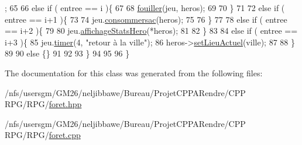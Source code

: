 \begin{DoxyCode}
      ;
65 
66         \textcolor{keywordflow}{else} \textcolor{keywordflow}{if} ( entree == i )\{
67 
68             \hyperlink{class_lieu_a90d7fd86c93e59830e20156ddb7aeb50}{fouiller}(jeu, heros);
69 
70         \}
71 
72         \textcolor{keywordflow}{else} \textcolor{keywordflow}{if} ( entree == i+1 )\{
73 
74             jeu.\hyperlink{class_jeu_a26c7a428a96b1f987150cb708fa7d903}{consommersac}(heros);
75 
76         \}
77 
78         \textcolor{keywordflow}{else} \textcolor{keywordflow}{if} ( entree == i+2 )\{
79 
80             jeu.\hyperlink{class_jeu_a7f9e3b8e6f3ad5d2c47ae29c54f2bdc4}{affichageStatsHero}(*heros);
81 
82         \}
83 
84         \textcolor{keywordflow}{else} \textcolor{keywordflow}{if} ( entree == i+3 )\{
85             jeu.\hyperlink{class_jeu_a52ce4fb6c415b45209db13a589c9d675}{timer}(4, \textcolor{stringliteral}{"retour à la ville"});
86             heros->\hyperlink{class_heros_a8decc0b04f6724de10d2e2a8d1c3395c}{setLieuActuel}(ville);
87 
88         \}
89 
90         \textcolor{keywordflow}{else} \{\}
91 
92 
93     \}
94     
95     
96     \}
\end{DoxyCode}


The documentation for this class was generated from the following files\-:\begin{DoxyCompactItemize}
\item 
/nfs/usersgm/\-G\-M26/neljibbawe/\-Bureau/\-Projet\-C\-P\-P\-A\-Rendre/\-C\-P\-P R\-P\-G/\-R\-P\-G/\hyperlink{foret_8hpp}{foret.\-hpp}\item 
/nfs/usersgm/\-G\-M26/neljibbawe/\-Bureau/\-Projet\-C\-P\-P\-A\-Rendre/\-C\-P\-P R\-P\-G/\-R\-P\-G/\hyperlink{foret_8cpp}{foret.\-cpp}\end{DoxyCompactItemize}
